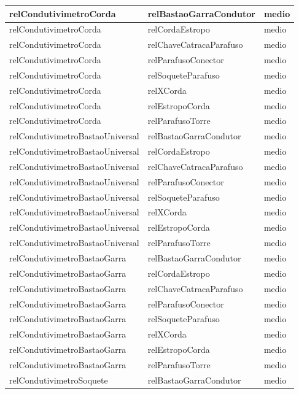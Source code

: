 \documentclass[12pt]{article}
\begin{document}
\begin{table}[H]
\begin{tabular}{|l|l|l|}
relCondutivimetroCorda & relBastaoGarraCondutor & medio \\ \hline
relCondutivimetroCorda & relCordaEstropo & medio \\ \hline
relCondutivimetroCorda & relChaveCatracaParafuso & medio \\ \hline
relCondutivimetroCorda & relParafusoConector & medio \\ \hline
relCondutivimetroCorda & relSoqueteParafuso & medio \\ \hline
relCondutivimetroCorda & relXCorda & medio \\ \hline
relCondutivimetroCorda & relEstropoCorda & medio \\ \hline
relCondutivimetroCorda & relParafusoTorre & medio \\ \hline
relCondutivimetroBastaoUniversal & relBastaoGarraCondutor & medio \\ \hline
relCondutivimetroBastaoUniversal & relCordaEstropo & medio \\ \hline
relCondutivimetroBastaoUniversal & relChaveCatracaParafuso & medio \\ \hline
relCondutivimetroBastaoUniversal & relParafusoConector & medio \\ \hline
relCondutivimetroBastaoUniversal & relSoqueteParafuso & medio \\ \hline
relCondutivimetroBastaoUniversal & relXCorda & medio \\ \hline
relCondutivimetroBastaoUniversal & relEstropoCorda & medio \\ \hline
relCondutivimetroBastaoUniversal & relParafusoTorre & medio \\ \hline
relCondutivimetroBastaoGarra & relBastaoGarraCondutor & medio \\ \hline
relCondutivimetroBastaoGarra & relCordaEstropo & medio \\ \hline
relCondutivimetroBastaoGarra & relChaveCatracaParafuso & medio \\ \hline
relCondutivimetroBastaoGarra & relParafusoConector & medio \\ \hline
relCondutivimetroBastaoGarra & relSoqueteParafuso & medio \\ \hline
relCondutivimetroBastaoGarra & relXCorda & medio \\ \hline
relCondutivimetroBastaoGarra & relEstropoCorda & medio \\ \hline
relCondutivimetroBastaoGarra & relParafusoTorre & medio \\ \hline
relCondutivimetroSoquete & relBastaoGarraCondutor & medio \\ \hline

\end{tabular}
\end{table}
\end{document}
